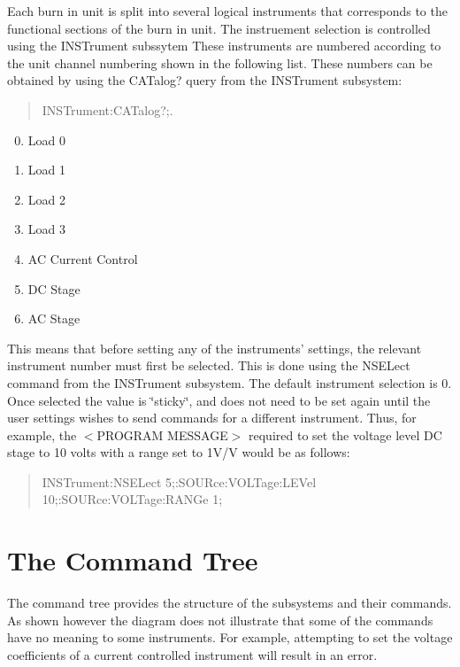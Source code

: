 Each burn in unit is split into several logical instruments that corresponds to the functional sections of the burn in unit. The instruement selection is controlled using the {\ttfamily I\-N\-S\-Trument} subssytem These instruments are numbered according to the unit channel numbering shown in the following list. These numbers can be obtained by using the {\ttfamily C\-A\-Talog}? query from the {\ttfamily I\-N\-S\-Trument} subsystem\-: \begin{quotation}
{\ttfamily I\-N\-S\-Trument\-:C\-A\-Talog?;}.

\end{quotation}


\begin{enumerate}\setcounter{enumi}{-1} \item Load 0 \item Load 1 \item Load 2 \item Load 3 \item AC Current Control \item DC Stage \item AC Stage \end{enumerate}

This means that before setting any of the instruments' settings, the relevant instrument number must first be selected. This is done using the {\ttfamily N\-S\-E\-Lect} command from the {\ttfamily I\-N\-S\-Trument} subsystem. The default instrument selection is 0. Once selected the value is \char`\"{}sticky\char`\"{}, and does not need to be set again until the user settings wishes to send commands for a different instrument. Thus, for example, the {\ttfamily $<$}P\-R\-O\-G\-R\-A\-M M\-E\-S\-S\-A\-G\-E{\ttfamily $>$} required to set the voltage level D\-C stage to 10 volts with a range set to 1\-V/\-V would be as follows\-: \begin{quotation}
{\ttfamily I\-N\-S\-Trument\-:N\-S\-E\-Lect 5;\-:S\-O\-U\-Rce\-:\-V\-O\-L\-Tage\-:L\-E\-Vel 10;\-:S\-O\-U\-Rce\-:\-V\-O\-L\-Tage\-:R\-A\-N\-Ge 1;}

\end{quotation}
\hypertarget{a00001_tree}{}\section{The Command Tree}\label{a00001_tree}
The command tree provides the structure of the subsystems and their commands. As shown however the diagram does not illustrate that some of the commands have no meaning to some instruments. For example, attempting to set the voltage coefficients of a current controlled instrument will result in an error.


